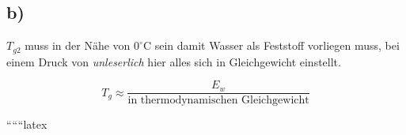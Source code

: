 

\subsection*{b)}

$T_{g2}$ muss in der Nähe von $0^\circ \text{C}$ sein damit Wasser als Feststoff vorliegen muss, bei einem Druck von \textit{unleserlich} hier alles sich in Gleichgewicht einstellt. 

\[
T_{g} \approx \frac{E_w}{\text{in thermodynamischen Gleichgewicht}}
\]

``````latex